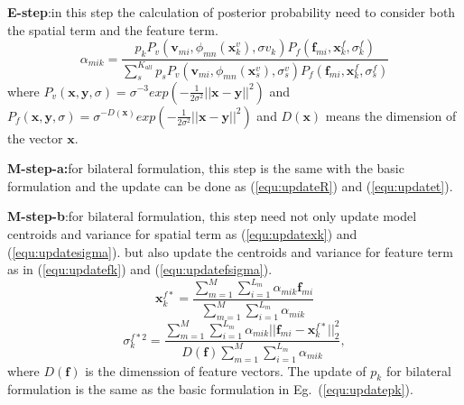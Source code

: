 \noindent\textbf{E-step}:in this step the calculation of posterior probability need to consider both the spatial term and the feature term.
\begin{equation}
\label{equ:bestep}
\alpha_{mik}=\frac{p_kP_v( \mathbf{v}_{mi},\phi_{mn}(\mathbf{x}^v_k),\sigma v_k)P_f(\mathbf f_{mi},\mathbf x^f_k,\sigma^f_k)}{\sum_s^{K_{all}}p_sP_v( \mathbf v_{mi},\phi_{mn}(\mathbf{x}^v_s),\sigma^v_s)P_f(\mathbf f_{mi},\mathbf{x}^f_k,\sigma^f_s)}
\end{equation}
where $P_v(\mathbf{x},\mathbf{y},\sigma)=\sigma^{-3}exp(-\frac{1}{2\sigma^2}||\mathbf{x}-\mathbf{y}||^2)$ and $P_f(\mathbf{x},\mathbf{y},\sigma)=\sigma^{-D(\mathbf{x})}exp(-\frac{1}{2\sigma^2}||\mathbf{x}-\mathbf{y}||^2)$ and $D(\mathbf{x})$ means the dimension of the vector $\mathbf x$. 

\textbf{M-step-a:}for bilateral formulation, this step is the same with the basic formulation and the update can be done as (\ref{equ:updateR}) and (\ref{equ:updatet}).

\textbf{M-step-b}:for bilateral formulation, this step need not only update model centroids and variance for spatial term as (\ref{equ:updatexk}) and (\ref{equ:updatesigma}).
but also update the centroids and variance for feature term as in (\ref{equ:updatefk}) and (\ref{equ:updatefsigma}).
\begin{equation}
\label{equ:updatefk}
\mathbf{x}_k^{f*}=\frac{\sum_{m=1}^M\sum_{i=1}^{L_m}\alpha_{mik}\mathbf{f}_{mi}}{\sum_{m=1}^M\sum_{i=1}^{L_m}\alpha_{mik}}
\end{equation}
\begin{equation}
\label{equ:updatefsigma}
\sigma_k^{f*2}=\frac{\sum_{m=1}^M\sum_{i=1}^{L_m}\alpha_{mik}||\mathbf {f}_{mi}-\mathbf{x}_k^{f*}||_2^2}{D(\mathbf{f})\sum_{m=1}^M\sum_{i=1}^{L_m}\alpha_{mik}},
\end{equation}
where $D(\mathbf{f})$ is the dimenssion of feature vectors. The update of $p_k$ for bilateral formulation is the same as the basic formulation in Eg.~(\ref{equ:updatepk}).
